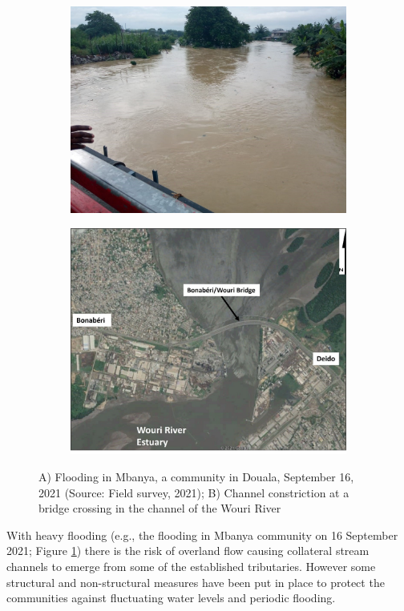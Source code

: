 \begin{figure} %
     \centering
     \begin{subfigure}[b]{0.45\textwidth}
	\centering
	\includegraphics[width=0.8\linewidth]{figure/mbanya.jpg}
	\caption{}
	\label{fig:mbanya}
	\end{subfigure}
	 \hfill
     \begin{subfigure}[b]{0.45\textwidth}
	\centering
	\includegraphics[width=0.7\linewidth]{figure/wouri_river.jpg}
	\caption{}
	\label{fig:wouri_river}
	\end{subfigure}
	\caption{A) Flooding in Mbanya, a community in Douala, September 16, 2021 
                (Source: Field survey, 2021); B) Channel constriction at a bridge crossing in the channel of the Wouri River}
                
\end{figure}

With heavy flooding (e.g., the flooding in Mbanya community on 16 September 2021; Figure \ref{fig:mbanya}) there is the risk of overland flow causing collateral stream channels to emerge from some of the established tributaries. However some structural and non-structural measures have been put in place to protect the communities against fluctuating water levels and periodic flooding. 

